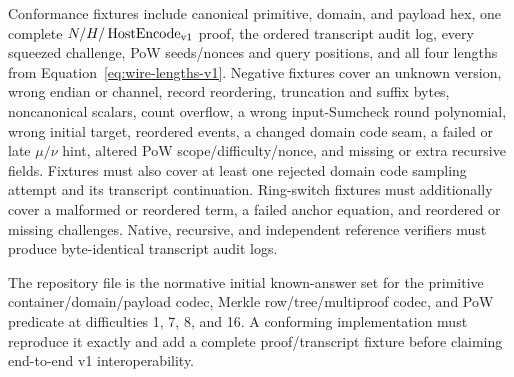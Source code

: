 Conformance fixtures \must{} include canonical primitive, domain, and payload
hex, one
complete $N/H/\operatorname{HostEncode}_{\rm v1}$ proof, the ordered transcript audit log, every
squeezed challenge, PoW seeds/nonces and query positions, and all four lengths
from Equation~\eqref{eq:wire-lengths-v1}.  Negative fixtures \must{} cover an
unknown version, wrong endian or channel, record
reordering, truncation and suffix bytes, noncanonical scalars, count overflow,
a wrong input-Sumcheck round polynomial, wrong initial target, reordered
 events, a changed domain code  seam, a failed or late
$\mu/\nu$ hint, altered PoW scope/difficulty/nonce, and missing or extra
recursive fields.  Fixtures must also cover at least one rejected
domain code  sampling attempt and its transcript continuation.
Ring-switch fixtures must additionally cover a malformed or reordered
 term, a failed anchor equation, and reordered or missing
 challenges.  Native, recursive, and independent reference
verifiers must produce byte-identical transcript audit logs.

The repository file  is the normative initial
known-answer set for the primitive container/domain/payload codec,
Merkle row/tree/multiproof codec, and PoW predicate at difficulties 1, 7, 8,
and 16.  A conforming implementation must reproduce it exactly and add a
complete proof/transcript
fixture before claiming end-to-end v1 interoperability.

\endgroup
